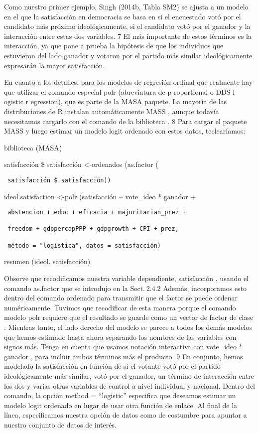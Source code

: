 \documentclass[
]{book}
\begin{document}
Como nuestro primer ejemplo, Singh (2014b, Tabla SM2) se ajusta a un modelo en el que la satisfacción en democracia se basa en si el encuestado votó por el candidato más próximo ideológicamente, si el candidato votó por el ganador y la interacción entre estas dos variables. 7 El más importante de estos términos es la interacción, ya que pone a prueba la hipótesis de que los individuos que estuvieron del lado ganador y votaron por el partido más similar ideológicamente expresarán la mayor satisfacción.

En cuanto a los detalles, para los modelos de regresión ordinal que realmente hay que utilizar el comando especial polr (abreviatura de p roportional o DDS l ogistic r egression), que es parte de la MASA paquete. La mayoría de las distribuciones de R instalan automáticamente MASS , aunque todavía necesitamos cargarlo con el comando de la biblioteca . 8 Para cargar el paquete MASS y luego estimar un modelo logit ordenado con estos datos, teclearíamos:

biblioteca (MASA)

satisfacción \$ satisfacción \textless-ordenados (as.factor (

\begin{verbatim}
 satisfacción $ satisfacción))
\end{verbatim}

ideol.satisfaction \textless-polr (satisfacción \textasciitilde{} vote\_ideo * ganador +

\begin{verbatim}
 abstencion + educ + eficacia + majoritarian_prez +

 freedom + gdppercapPPP + gdpgrowth + CPI + prez,

 método = "logística", datos = satisfacción)
\end{verbatim}

resumen (ideol. satisfacción)

Observe que recodificamos nuestra variable dependiente, satisfacción , usando el comando as.factor que se introdujo en la Sect. 2.4.2 Además, incorporamos esto dentro del comando ordenado para transmitir que el factor se puede ordenar numéricamente. Tuvimos que recodificar de esta manera porque el comando modelo polr requiere que el resultado se guarde como un vector de factor de clase . Mientras tanto, el lado derecho del modelo se parece a todos los demás modelos que hemos estimado hasta ahora separando los nombres de las variables con signos más. Tenga en cuenta que usamos notación interactiva con vote\_ideo * ganador , para incluir ambos términos más el producto. 9 En conjunto, hemos modelado la satisfacción en función de si el votante votó por el partido ideológicamente más similar, votó por el ganador, un término de interacción entre los dos y varias otras variables de control a nivel individual y nacional. Dentro del comando, la opción method = ``logistic'' especifica que deseamos estimar un modelo logit ordenado en lugar de usar otra función de enlace. Al final de la línea, especificamos nuestra opción de datos como de costumbre para apuntar a nuestro conjunto de datos de interés.
\end{document}
